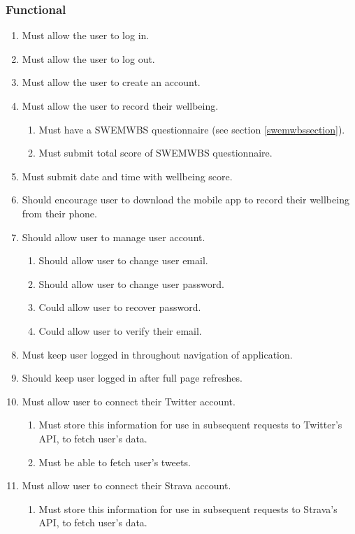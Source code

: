 \documentclass[11pt,openright,a4paper]{report}
\begin{document}
\subsubsection{Functional}
\begin{enumerate}
\item Must allow the user to log in.
\item Must allow the user to log out.
\item Must allow the user to create an account.
\item Must allow the user to record their wellbeing.
  \begin{enumerate}
  \item Must have a SWEMWBS questionnaire (see section \ref{swemwbssection}).
  \item Must submit total score of SWEMWBS questionnaire.
  \end{enumerate}
\item Must submit date and time with wellbeing score.
\item Should encourage user to download the mobile app to record their wellbeing from their phone.
\item Should allow user to manage user account.
  \begin{enumerate}
  \item Should allow user to change user email.
  \item Should allow user to change user password.
  \item Could allow user to recover password.
  \item Could allow user to verify their email.
  \end{enumerate}
\item Must keep user logged in throughout navigation of application.
\item Should keep user logged in after full page refreshes.
\item Must allow user to connect their Twitter account.
  \begin{enumerate}
  \item Must store this information for use in subsequent requests to Twitter's API, to fetch user's data.
  \item Must be able to fetch user's tweets.
  \end{enumerate}
\item Must allow user to connect their Strava account.
  \begin{enumerate}
  \item Must store this information for use in subsequent requests to Strava's API, to fetch user's data.

\end{enumerate}
\end{enumerate}
\end{document}
